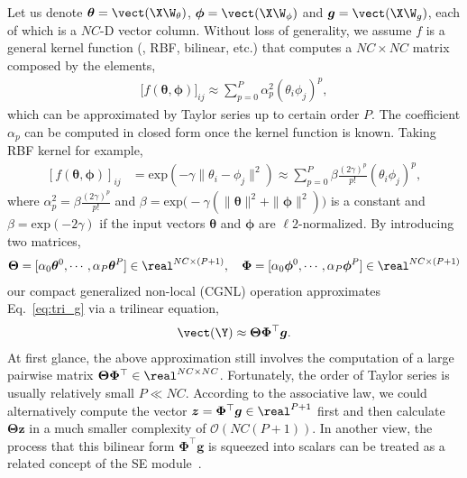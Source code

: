 \documentclass{article}
\begin{document}
Let us denote $\bm{\theta} = \vect(\X \W_\theta)$, $\bm{\phi} = \vect(\X \W_\phi)$ and $\bm{g} = \vect(\X \W_g)$, each of which is a $NC$-D vector column.
Without loss of generality, we assume $f$ is a general kernel function (\eg, RBF, bilinear, etc.) that computes a $NC \times NC$ matrix composed by the elements,
\begin{align}
  \label{eq:taylor_series}
  \big[ f(\bm{\theta}, \bm{\phi}) \big]_{ij} \approx \sum_{p=0}^{P} \alpha_p^2 (\theta_i \phi_j)^p,
\end{align}
which can be approximated by Taylor series up to certain order $P$.
The coefficient $\alpha_p$ can be computed in closed form once the kernel function is known.
Taking RBF kernel for example,
\begin{align}
  \label{eq:rbf}
  [f(\bm{\theta}, \bm{\phi})]_{ij} &= \text{exp}(-\gamma \| \theta_i - \phi_j \|^2)
                                     \approx \sum_{p=0}^{P} \beta \frac{(2\gamma)^p}{p!} (\theta_i \phi_j)^p,
\end{align}
where $\alpha_p^2 = \beta \frac{(2\gamma)^p}{p!}$ and $\beta = \text{exp} \big( -\gamma( \|\bm{\theta}\|^2 + \|\bm{\phi}\|^2 ) \big)$ is a constant and $\beta = \text{exp}(-2\gamma)$ if the input vectors $\bm{\theta}$ and $\bm{\phi}$ are $\ell2$-normalized.
By introducing two matrices,
\begin{align}
  \bm{\Theta} = [\alpha_0 \bm{\theta}^0, \cdots, \alpha_{P} \bm{\theta}^{P}] \in \real^{NC \times (P+1)}, \quad
  \bm{\Phi} = [\alpha_0 \bm{\phi}^0, \cdots, \alpha_{P} \bm{\phi}^{P}] \in \real^{NC \times (P+1)}
\end{align}
our compact generalized non-local (CGNL) operation approximates Eq.~\ref{eq:tri_g} via a trilinear equation,
\begin{align}
  \label{eq:final}
  \vect(\Y) \approx \bm{\Theta} \bm{\Phi}^\top \bm{g}.
\end{align}
At first glance, the above approximation still involves the computation of a large pairwise matrix $\bm{\Theta} \bm{\Phi}^\top \in \real^{NC \times NC}$.
Fortunately, the order of Taylor series is usually relatively small $P \ll NC$.
According to the associative law, we could alternatively compute the vector $\bm{z} = \bm{\Phi}^\top \bm{g} \in \real^{P+1}$ first and then calculate $\bm{\Theta} \bm{z}$ in a much smaller complexity of $\mathcal{O}(NC(P + 1))$. In another view, the process that this bilinear form $\bm{\Phi}^\top \bm{g}$ is squeezed into scalars can be treated as a related concept of the SE module~\cite{senet}.
\end{document}
